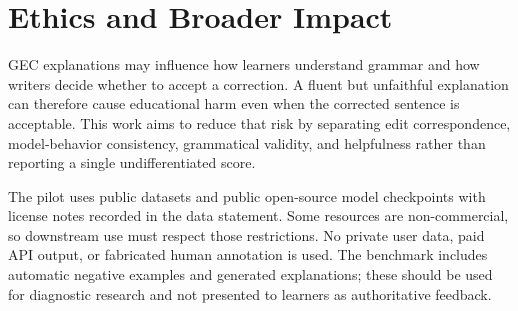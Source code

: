 \section{Ethics and Broader Impact}

GEC explanations may influence how learners understand grammar and how writers decide whether to accept a correction. A fluent but unfaithful explanation can therefore cause educational harm even when the corrected sentence is acceptable. This work aims to reduce that risk by separating edit correspondence, model-behavior consistency, grammatical validity, and helpfulness rather than reporting a single undifferentiated score.

The pilot uses public datasets and public open-source model checkpoints with license notes recorded in the data statement. Some resources are non-commercial, so downstream use must respect those restrictions. No private user data, paid API output, or fabricated human annotation is used. The benchmark includes automatic negative examples and generated explanations; these should be used for diagnostic research and not presented to learners as authoritative feedback.
